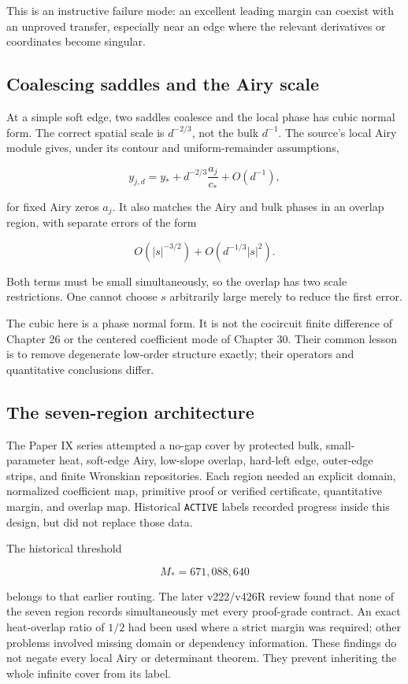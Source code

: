 \documentclass[
  10pt,
  a4paper,
  10pt,
  oneside,
  openany]{book}
\begin{document}
This is an instructive failure mode: an excellent leading margin can
coexist with an unproved transfer, especially near an edge where the
relevant derivatives or coordinates become singular.

\subsection{Coalescing saddles and the Airy
scale}\label{coalescing-saddles-and-the-airy-scale}

At a simple soft edge, two saddles coalesce and the local phase has
cubic normal form. The correct spatial scale is \(d^{-2/3}\), not the
bulk \(d^{-1}\). The source's local Airy module gives, under its contour
and uniform-remainder assumptions,

\[
 y_{j,d}=y_*+d^{-2/3}\frac{a_j}{c_*}+O(d^{-1}),
 \tag{31.3}\label{eq:31.3}
\]

for fixed Airy zeros \(a_j\). It also matches the Airy and bulk phases
in an overlap region, with separate errors of the form

\[
 O(|s|^{-3/2})+O(d^{-1/3}|s|^2).
\]

Both terms must be small simultaneously, so the overlap has two scale
restrictions. One cannot choose \(s\) arbitrarily large merely to reduce
the first error.

The cubic here is a phase normal form. It is not the cocircuit finite
difference of Chapter 26 or the centered coefficient mode of Chapter 30.
Their common lesson is to remove degenerate low-order structure exactly;
their operators and quantitative conclusions differ.

\subsection{The seven-region
architecture}\label{the-seven-region-architecture}

The Paper IX series attempted a no-gap cover by protected bulk,
small-parameter heat, soft-edge Airy, low-slope overlap, hard-left edge,
outer-edge strips, and finite Wronskian repositories. Each region needed
an explicit domain, normalized coefficient map, primitive proof or
verified certificate, quantitative margin, and overlap map. Historical
\texttt{ACTIVE} labels recorded progress inside this design, but did not
replace those data.

The historical threshold

\[
 M_*=671{,}088{,}640
\]

belongs to that earlier routing. The later v222/v426R review found that
none of the seven region records simultaneously met every proof-grade
contract. An exact heat-overlap ratio of \(1/2\) had been used where a
strict margin was required; other problems involved missing domain or
dependency information. These findings do not negate every local Airy or
determinant theorem. They prevent inheriting the whole infinite cover
from its label.
\end{document}
